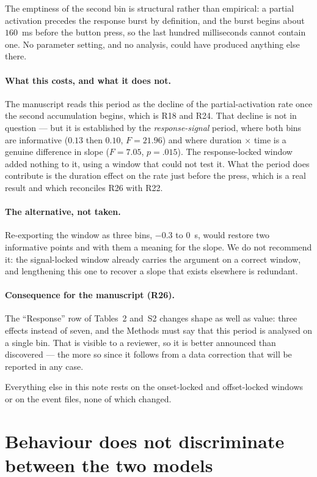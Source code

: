 \documentclass[a4paper,11pt]{article}
\newcommand{\1}{\mathbbm{1}}
\begin{document}
The emptiness of the second bin is structural rather than empirical: a partial activation
precedes the response burst by definition, and the burst begins about $160$~ms before the
button press, so the last hundred milliseconds cannot contain one. No parameter setting,
and no analysis, could have produced anything else there.

\paragraph{What this costs, and what it does not.} The manuscript reads this period as the
decline of the partial-activation rate once the second accumulation begins, which is R18
and R24. That decline is not in question --- but it is established by the
\emph{response-signal} period, where both bins are informative ($0.13$ then $0.10$,
$F=21.96$) and where duration $\times$ time is a genuine difference in slope
($F=7.05$, $p=.015$). The response-locked window added nothing to it, using a window that could
not test it. What the period does contribute is the duration effect on the rate just
before the press, which is a real result and which reconciles R26 with R22.

\paragraph{The alternative, not taken.} Re-exporting the window as three bins, $-0.3$ to
$0$~s, would restore two informative points and with them a meaning for the slope. We do
not recommend it: the signal-locked window already carries the argument on a correct
window, and lengthening this one to recover a slope that exists elsewhere is redundant.

\paragraph{Consequence for the manuscript (R26).} The ``Response'' row of Tables~2 and~S2
changes shape as well as value: three effects instead of seven, and the Methods must say
that this period is analysed on a single bin. That is visible to a reviewer, so it is
better announced than discovered --- the more so since it follows from a data correction
that will be reported in any case.



Everything else in this note rests on the onset-locked and offset-locked windows or on
the event files, none of which changed.

\section{Behaviour does not discriminate between the two models}
\label{sec:behav}
\end{document}
